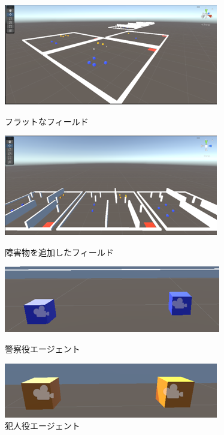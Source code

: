 \documentclass[dvipdfmx]{jsarticle}
\begin{document}
        \begin{figure}[H]
            \begin{minipage}[b]{0.5\linewidth}
                \centering
                \includegraphics[scale=0.4]{images/flat.png}
                \caption{フラットなフィールド}
            \end{minipage}
            \begin{minipage}[b]{0.5\linewidth}
                \centering
                \includegraphics[scale=0.4]{images/shogaibutu.png}
                \caption{障害物を追加したフィールド}
            \end{minipage}
            \begin{minipage}[b]{0.5\linewidth}
                \centering
                \includegraphics[scale=0.4]{images/Police.png}
                \caption{警察役エージェント}
            \end{minipage}
            \begin{minipage}[b]{0.5\linewidth}
                \centering
                \includegraphics[scale=0.4]{images/Criminer.png}
                \caption{犯人役エージェント}
            \end{minipage}
        \end{figure}
\end{document}

